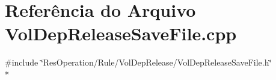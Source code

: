 \section{Referência do Arquivo Vol\+Dep\+Release\+Save\+File.\+cpp}
\label{_rule_2_vol_dep_release_2_vol_dep_release_save_file_8cpp}
{\ttfamily \#include \char`\"{}Res\+Operation/\+Rule/\+Vol\+Dep\+Release/\+Vol\+Dep\+Release\+Save\+File.\+h\char`\"{}}\\*
